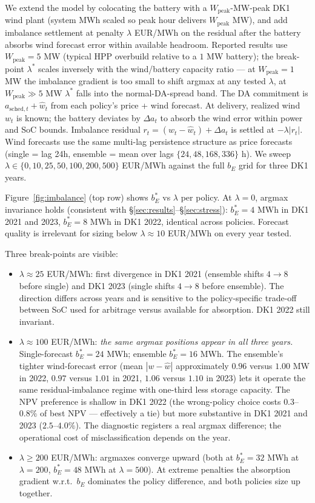 \documentclass[11pt]{article}
\begin{document}
We extend the model by colocating the battery with a $W_{\mathrm{peak}}$-MW-peak DK1 wind plant (system MWh scaled so peak hour delivers $W_{\mathrm{peak}}$ MW), and add imbalance settlement at penalty $\lambda$ EUR/MWh on the residual after the battery absorbs wind forecast error within available headroom. Reported results use $W_{\mathrm{peak}} = 5$ MW (typical HPP overbuild relative to a $1$ MW battery); the break-point $\lambda^*$ scales inversely with the wind/battery capacity ratio --- at $W_{\mathrm{peak}} = 1$ MW the imbalance gradient is too small to shift argmax at any tested $\lambda$, at $W_{\mathrm{peak}} \gg 5$ MW $\lambda^*$ falls into the normal-DA-spread band. The DA commitment is $a_{\mathrm{sched},t} + \hat{w}_t$ from each policy's price + wind forecast. At delivery, realized wind $w_t$ is known; the battery deviates by $\Delta a_t$ to absorb the wind error within power and SoC bounds. Imbalance residual $r_t = (w_t - \hat{w}_t) + \Delta a_t$ is settled at $-\lambda |r_t|$. Wind forecasts use the same multi-lag persistence structure as price forecasts (single = lag 24h, ensemble = mean over lags $\{24, 48, 168, 336\}$ h). We sweep $\lambda \in \{0, 10, 25, 50, 100, 200, 500\}$ EUR/MWh against the full $b_E$ grid for three DK1 years.

Figure~\ref{fig:imbalance} (top row) shows $b_E^*$ vs $\lambda$ per policy. At $\lambda = 0$, argmax invariance holds (consistent with \S\ref{sec:results}--\S\ref{sec:stress}): $b_E^* = 4$ MWh in DK1 2021 and 2023, $b_E^* = 8$ MWh in DK1 2022, identical across policies. Forecast quality is irrelevant for sizing below $\lambda \approx 10$ EUR/MWh on every year tested.

Three break-points are visible:
\begin{itemize}
\item $\lambda \approx 25$ EUR/MWh: first divergence in DK1 2021 (ensemble shifts $4 \to 8$ before single) and DK1 2023 (single shifts $4 \to 8$ before ensemble). The direction differs across years and is sensitive to the policy-specific trade-off between SoC used for arbitrage versus available for absorption. DK1 2022 still invariant.
\item $\lambda \approx 100$ EUR/MWh: \emph{the same argmax positions appear in all three years.} Single-forecast $b_E^* = 24$ MWh; ensemble $b_E^* = 16$ MWh. The ensemble's tighter wind-forecast error (mean $|w - \hat{w}|$ approximately $0.96$ versus $1.00$ MW in 2022, $0.97$ versus $1.01$ in 2021, $1.06$ versus $1.10$ in 2023) lets it operate the same residual-imbalance regime with one-third less storage capacity. The NPV preference is shallow in DK1 2022 (the wrong-policy choice costs $0.3$--$0.8\%$ of best NPV --- effectively a tie) but more substantive in DK1 2021 and 2023 ($2.5$--$4.0\%$). The diagnostic registers a real argmax difference; the operational cost of misclassification depends on the year.
\item $\lambda \geq 200$ EUR/MWh: argmaxes converge upward (both at $b_E^* = 32$ MWh at $\lambda = 200$, $b_E^* = 48$ MWh at $\lambda = 500$). At extreme penalties the absorption gradient w.r.t.\ $b_E$ dominates the policy difference, and both policies size up together.
\end{itemize}
\end{document}
